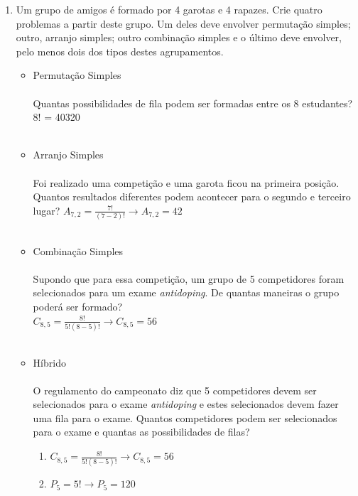 \documentclass[a4paper, 12pt]{article}
\begin{document}
\begin{enumerate}
\item Um grupo de amigos é formado por 4 garotas e 4 rapazes. Crie quatro problemas a partir deste grupo. Um deles deve envolver permutação simples; outro, arranjo simples; outro combinação simples e o último deve envolver, pelo menos dois dos tipos destes agrupamentos.\\
  \begin{itemize}
  \item Permutação Simples \\\\
    Quantas possibilidades de fila podem ser formadas entre os 8 estudantes?\\
    8! = 40320\\\\
  \item Arranjo Simples \\\\
    Foi realizado uma competição e uma garota ficou na primeira posição. Quantos resultados diferentes podem acontecer para o segundo e terceiro lugar?
    $A_{7,2}=\frac{7!}{(7-2)!}\rightarrow
     A_{7,2}=42$\\\\
   \item Combinação Simples\\\\
     Supondo que para essa competição, um grupo de 5 competidores foram selecionados para um exame \emph{antidoping}. De quantas maneiras o grupo poderá ser formado?\\
     $C_{8,5}=\frac{8!}{5!(8-5)!}\rightarrow
      C_{8,5}=56$\\\\
    \item Híbrido \\\\
      O regulamento do campeonato diz que 5 competidores devem ser selecionados para o exame \emph{antidoping} e estes selecionados devem fazer uma fila para o exame. Quantos competidores podem ser selecionados para o exame e quantas as possibilidades de filas?
      \begin{enumerate}
        \item $C_{8,5}=\frac{8!}{5!(8-5)!}\rightarrow
          C_{8,5}=56$
        \item $P_{5}=5!\rightarrow
              P_{5}=120$        
      \end{enumerate}
  \end{itemize}

\end{enumerate}
\end{document}
